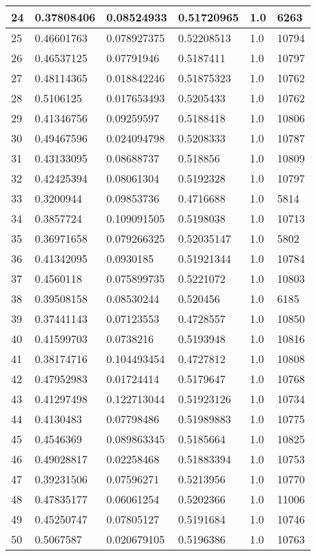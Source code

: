 \begin{longtable}{|l|l|l|l|l|l|}
24 & 0.37808406 & 0.08524933 & 0.51720965 & 1.0 & 6263 \\ \hline 
25 & 0.46601763 & 0.078927375 & 0.52208513 & 1.0 & 10794 \\ \hline 
26 & 0.46537125 & 0.07791946 & 0.5187411 & 1.0 & 10797 \\ \hline 
27 & 0.48114365 & 0.018842246 & 0.51875323 & 1.0 & 10762 \\ \hline 
28 & 0.5106125 & 0.017653493 & 0.5205433 & 1.0 & 10762 \\ \hline 
29 & 0.41346756 & 0.09259597 & 0.5188418 & 1.0 & 10806 \\ \hline 
30 & 0.49467596 & 0.024094798 & 0.5208333 & 1.0 & 10787 \\ \hline 
31 & 0.43133095 & 0.08688737 & 0.518856 & 1.0 & 10809 \\ \hline 
32 & 0.42425394 & 0.08061304 & 0.5192328 & 1.0 & 10797 \\ \hline 
33 & 0.3200944 & 0.09853736 & 0.4716688 & 1.0 & 5814 \\ \hline 
34 & 0.3857724 & 0.109091505 & 0.5198038 & 1.0 & 10713 \\ \hline 
35 & 0.36971658 & 0.079266325 & 0.52035147 & 1.0 & 5802 \\ \hline 
36 & 0.41342095 & 0.0930185 & 0.51921344 & 1.0 & 10784 \\ \hline 
37 & 0.4560118 & 0.075899735 & 0.5221072 & 1.0 & 10803 \\ \hline 
38 & 0.39508158 & 0.08530244 & 0.520456 & 1.0 & 6185 \\ \hline 
39 & 0.37441143 & 0.07123553 & 0.4728557 & 1.0 & 10850 \\ \hline 
40 & 0.41599703 & 0.0738216 & 0.5193948 & 1.0 & 10816 \\ \hline 
41 & 0.38174716 & 0.104493454 & 0.4727812 & 1.0 & 10808 \\ \hline 
42 & 0.47952983 & 0.01724414 & 0.5179647 & 1.0 & 10768 \\ \hline 
43 & 0.41297498 & 0.122713044 & 0.51923126 & 1.0 & 10734 \\ \hline 
44 & 0.4130483 & 0.07798486 & 0.51989883 & 1.0 & 10775 \\ \hline 
45 & 0.4546369 & 0.089863345 & 0.5185664 & 1.0 & 10825 \\ \hline 
46 & 0.49028817 & 0.02258468 & 0.51883394 & 1.0 & 10753 \\ \hline 
47 & 0.39231506 & 0.07596271 & 0.5213956 & 1.0 & 10770 \\ \hline 
48 & 0.47835177 & 0.06061254 & 0.5202366 & 1.0 & 11006 \\ \hline 
49 & 0.45250747 & 0.07805127 & 0.5191684 & 1.0 & 10746 \\ \hline 
50 & 0.5067587 & 0.020679105 & 0.5196386 & 1.0 & 10763 \\ \hline 
\end{longtable}